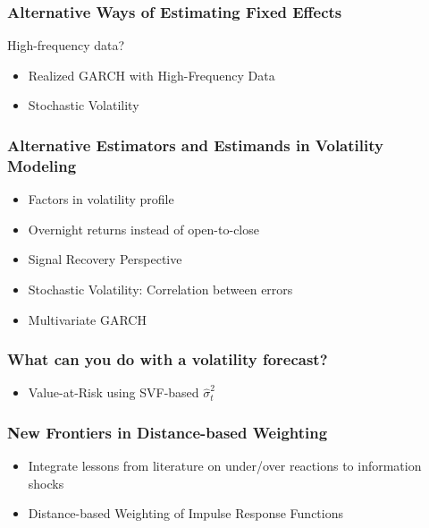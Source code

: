 \documentclass[9pt]{beamer}
\theoremstyle{definition}
\begin{document}
\begin{frame}
\frametitle{Alternative Ways of Estimating Fixed Effects}
High-frequency data?

\begin{itemize}

\item{Realized GARCH with High-Frequency Data}

\item{Stochastic Volatility}
\end{itemize}
\end{frame}

\begin{frame}
    \frametitle{Alternative Estimators and Estimands in Volatility Modeling}
    \begin{itemize}
        
        \item Factors in volatility profile
        \item Overnight returns instead of open-to-close
        
        \item Signal Recovery Perspective \parencite{ferwana2022optimal}
        
        \item Stochastic Volatility: Correlation between errors
        \item Multivariate GARCH
        
        \end{itemize}
\end{frame}

\begin{frame}
    \frametitle{What can you do with a volatility forecast?}
    \begin{itemize}
        \item{Value-at-Risk using SVF-based $\hat\sigma^{2}_{t}$}
        \end{itemize}
\end{frame}

\begin{frame}
    \frametitle{New Frontiers in Distance-based Weighting}
    \begin{itemize}
        \item Integrate lessons from literature on under/over reactions to information shocks \parencite[][]{jiang2017information}
        \item{Distance-based Weighting of Impulse Response Functions}
        \end{itemize}
\end{frame}
\end{document}
